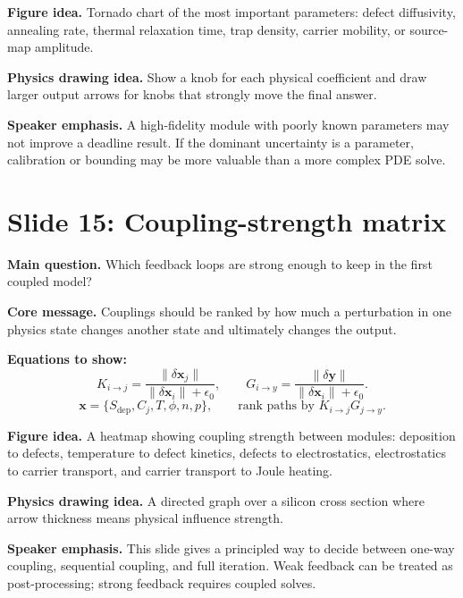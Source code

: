 \documentclass[11pt]{article}
\begin{document}
\textbf{Figure idea.} Tornado chart of the most important parameters: defect diffusivity, annealing rate, thermal relaxation time, trap density, carrier mobility, or source-map amplitude.

\textbf{Physics drawing idea.} Show a knob for each physical coefficient and draw larger output arrows for knobs that strongly move the final answer.

\textbf{Speaker emphasis.} A high-fidelity module with poorly known parameters may not improve a deadline result. If the dominant uncertainty is a parameter, calibration or bounding may be more valuable than a more complex PDE solve.

\section{Slide 15: Coupling-strength matrix}
\begin{physicsbox}
\textbf{Main question.} Which feedback loops are strong enough to keep in the first coupled model?
\end{physicsbox}

\textbf{Core message.} Couplings should be ranked by how much a perturbation in one physics state changes another state and ultimately changes the output.

\textbf{Equations to show:}
\begin{equation*}
K_{i\to j}=\frac{\|\delta \mathbf{x}_j\|}{\|\delta \mathbf{x}_i\|+\epsilon_0},
\qquad
G_{i\to y}=\frac{\|\delta\mathbf{y}\|}{\|\delta \mathbf{x}_i\|+\epsilon_0}.
\end{equation*}
\begin{equation*}
\mathbf{x}=\{S_{\mathrm{dep}}, C_j, T, \phi, n,p\},
\qquad
\text{rank paths by }K_{i\to j}G_{j\to y}.
\end{equation*}

\textbf{Figure idea.} A heatmap showing coupling strength between modules: deposition to defects, temperature to defect kinetics, defects to electrostatics, electrostatics to carrier transport, and carrier transport to Joule heating.

\textbf{Physics drawing idea.} A directed graph over a silicon cross section where arrow thickness means physical influence strength.

\textbf{Speaker emphasis.} This slide gives a principled way to decide between one-way coupling, sequential coupling, and full iteration. Weak feedback can be treated as post-processing; strong feedback requires coupled solves.
\end{document}
